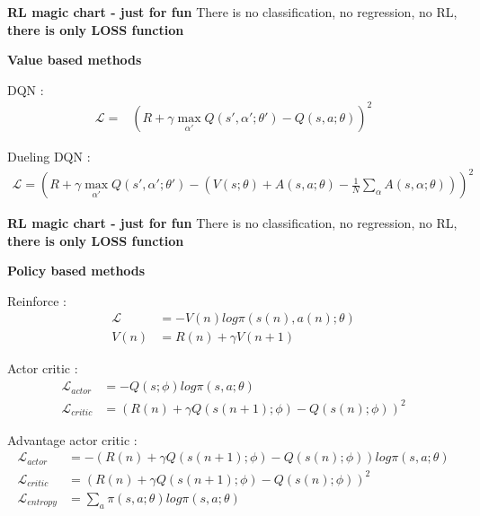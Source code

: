 \documentclass[xcolor=dvipsnames]{beamer}
\begin{document}
\begin{frame}{\bf RL magic chart - just for fun}
There is no classification, no regression, no RL, \\ {\bf there is only LOSS function}

{\bf Value based methods}

DQN : 
\begin{align*}
\mathcal{L}= &\left( R + \gamma \max \limits_{\alpha'} Q(s', \alpha'; \theta ') - Q(s, a; \theta) \right) ^2
\end{align*}

Dueling DQN : 
{\small
\begin{align*}
\mathcal{L}= \left(  R + \gamma \max \limits_{\alpha'} Q(s', \alpha'; \theta ') - \left( V(s; \theta) + A(s, a; \theta) - \frac{1}{N}\sum_{\alpha} A(s, \alpha; \theta) \right) \right)^2
\end{align*}
}
\end{frame}






\begin{frame}{\bf RL magic chart - just for fun}
There is no classification, no regression, no RL, \\ {\bf there is only LOSS function}

{\bf Policy based methods}

Reinforce : 
\begin{align*}
\mathcal{L}&= -V(n) log \pi(s(n), a(n); \theta) \\
       V(n)&= R(n) + \gamma V(n+1)
\end{align*}

Actor critic : 
\begin{align*}
\mathcal{L}_{actor}&= -Q(s; \phi) log \pi(s, a; \theta) \\
\mathcal{L}_{critic}&= \left( R(n) + \gamma Q(s(n+1); \phi) - Q(s(n); \phi)  \right)^2
\end{align*}

Advantage actor critic : 
\begin{align*}
\mathcal{L}_{actor}&= -\left( R(n) + \gamma Q(s(n+1); \phi) - Q(s(n); \phi)  \right) log \pi(s, a; \theta) \\
\mathcal{L}_{critic}&= \left( R(n) + \gamma Q(s(n+1); \phi) - Q(s(n); \phi)  \right)^2 \\
\mathcal{L}_{entropy}&= \sum_a \pi(s, a; \theta) log \pi(s, a; \theta)
\end{align*}

\end{frame}
\end{document}
